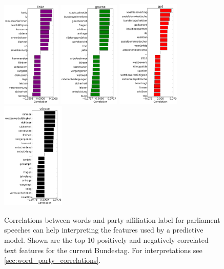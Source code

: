 \documentclass[runningheads,a4paper]{llncs}
\begin{document}
\begin{figure}
\begin{center}
\includegraphics[width=2.8cm]{images/party_word_correlations-linke-18.pdf} 
\includegraphics[width=2.9cm]{images/party_word_correlations-gruene-18.pdf} 
\includegraphics[width=3cm]{images/party_word_correlations-spd-18.pdf} 
\includegraphics[width=3cm]{images/party_word_correlations-cducsu-18.pdf}
%
\end{center}
\caption{
\label{fig:party_word_correlations}
Correlations between words and party affiliation label for parliament speeches can help interpreting the features used by a predictive model. Shown are the top 10 positively and negatively correlated text features for the current Bundestag. For interpretations see \autoref{sec:word_party_correlations}.}
\end{figure}
\end{document}
